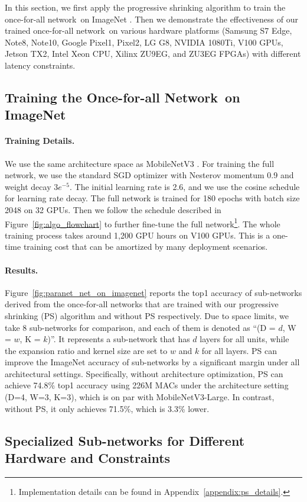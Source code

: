 \documentclass{article} \usepackage{iclr2020_conference,times}
\newcommand{\myparagraph}[1]{\vspace{-3pt}\paragraph{#1}}
\newcommand{\motherNet}{once-for-all network}
\newcommand{\motherNetCap}{Once-for-all Network}
\newcommand{\childNetCap}{Sub-network}
\begin{document}
In this section, we first apply the progressive shrinking algorithm to train the \motherNet~on ImageNet \citep{deng2009imagenet}. Then we demonstrate the effectiveness of our trained \motherNet~on various hardware platforms (Samsung S7 Edge, Note8, Note10, Google Pixel1, Pixel2, LG G8, NVIDIA 1080Ti, V100 GPUs, Jetson TX2, Intel Xeon CPU, Xilinx ZU9EG, and ZU3EG FPGAs) with different latency constraints. 

\subsection{Training the \motherNetCap~on ImageNet}

\myparagraph{Training Details.} We use the same architecture space as MobileNetV3 \citep{howard2019searching}. For training the full network, we use the standard SGD optimizer with Nesterov momentum 0.9 and weight decay $3e^{-5}$. The initial learning rate is 2.6, and we use the cosine schedule \citep{loshchilov2016sgdr} for learning rate decay. The full network is trained for 180 epochs with batch size 2048 on 32 GPUs. Then we follow the schedule described in Figure~\ref{fig:algo_flowchart} to further fine-tune the full network\footnote{Implementation details can be found in Appendix~\ref{appendix:ps_details}.}. The whole training process takes around 1,200 GPU hours on V100 GPUs. This is a one-time training cost that can be amortized by many deployment scenarios. 

\myparagraph{Results.} Figure~\ref{fig:paranet_net_on_imagenet} reports the top1 accuracy of sub-networks derived from the \motherNet s that are trained with our progressive shrinking (PS) algorithm and without PS respectively. Due to space limits, we take 8 sub-networks for comparison, and each of them is denoted as ``(D = $d$, W = $w$, K = $k$)''. It represents a sub-network that has $d$ layers for all units, while the expansion ratio and kernel size are set to $w$ and $k$ for all layers. PS can improve the ImageNet accuracy of sub-networks by a significant margin under all architectural settings. Specifically, without architecture optimization, PS can achieve 74.8\% top1 accuracy using 226M MACs under the architecture setting (D=4, W=3, K=3), which is on par with MobileNetV3-Large. In contrast, without PS, it only achieves 71.5\%, which is 3.3\% lower.

\subsection{Specialized \childNetCap s for Different Hardware and Constraints}
\end{document}

